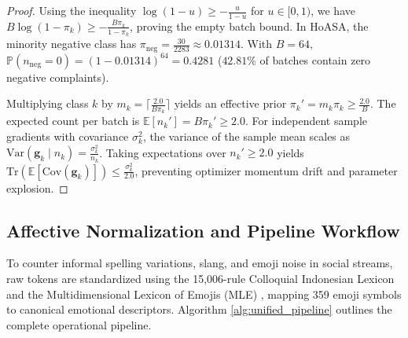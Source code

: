\documentclass[final,5p,times,twocolumn]{elsarticle}
\begin{document}
\begin{proof}
Using the inequality $\log(1 - u) \ge -\frac{u}{1-u}$ for $u \in [0, 1)$, we have $B \log(1 - \pi_k) \ge -\frac{B \pi_k}{1 - \pi_k}$, proving the empty batch bound. In HoASA, the minority negative class has $\pi_{\text{neg}} = \frac{30}{2283} \approx 0.01314$. With $B=64$, $\mathbb{P}(n_{\text{neg}}=0) = (1 - 0.01314)^{64} = 0.4281$ ($42.81\%$ of batches contain zero negative complaints).

Multiplying class $k$ by $m_k = \lceil \frac{2.0}{B \pi_k} \rceil$ yields an effective prior $\pi_k' = m_k \pi_k \ge \frac{2.0}{B}$. The expected count per batch is $\mathbb{E}[n_k'] = B \pi_k' \ge 2.0$. For independent sample gradients with covariance $\sigma_k^2$, the variance of the sample mean scales as $\mathrm{Var}(\mathbf{g}_k \mid n_k) = \frac{\sigma_k^2}{n_k}$. Taking expectations over $n_k' \ge 2.0$ yields $\mathrm{Tr}(\mathbb{E}[\mathrm{Cov}(\mathbf{g}_k)]) \le \frac{\sigma_k^2}{2.0}$, preventing optimizer momentum drift and parameter explosion.
\end{proof}

\subsection{Affective Normalization and Pipeline Workflow}
To counter informal spelling variations, slang, and emoji noise in social streams, raw tokens are standardized using the 15,006-rule Colloquial Indonesian Lexicon \cite{salsabila2018colloquial} and the Multidimensional Lexicon of Emojis (MLE) \cite{godard2022multidimensional}, mapping 359 emoji symbols to canonical emotional descriptors. Algorithm \ref{alg:unified_pipeline} outlines the complete operational pipeline.
\end{document}
